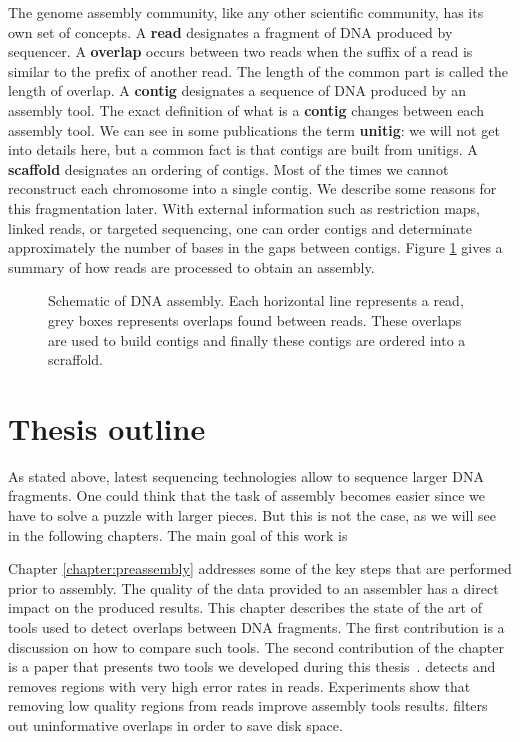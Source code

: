 \documentclass[./main.tex]{subfiles}
\begin{document}
\bigskip

The genome assembly community, like any other scientific community, has its own set of concepts. 
%
A \textbf{read} designates a fragment of DNA produced by sequencer.
%
A \textbf{overlap} occurs between two reads when the suffix of a read is similar to the prefix of another read. The length of the common part is called the length of overlap.
%
A \textbf{contig} designates a sequence of DNA produced by an assembly tool. The exact definition of what is a \textbf{contig} changes between each assembly tool. We can see in some publications the term \textbf{unitig}: we will not get into details here, but a common fact is that contigs are built from unitigs.
%
A \textbf{scaffold} designates an ordering of contigs. Most of the times we cannot reconstruct each chromosome into a single contig. We describe some reasons for this fragmentation later. With external information such as restriction maps, linked reads, or targeted sequencing, one can order contigs and determinate approximately the number of bases in the gaps between contigs. %
%
Figure \ref{intro:fig:assembly} gives a summary of how reads are processed to obtain an assembly.
\begin{figure}[ht]
	\centering
	
	\caption{Schematic of DNA assembly. Each horizontal line represents a read, grey boxes represents overlaps found between reads. These overlaps are used to build contigs and finally these contigs are ordered into a scraffold.}
    \label{intro:fig:assembly}
\end{figure}

\section{Thesis outline}


As stated above, latest sequencing technologies allow to sequence larger DNA fragments. One could think that the task of assembly becomes easier since we have to solve a puzzle with larger pieces. But this is not the case, as we will see in the following chapters. The main goal of this work is 


Chapter \ref{chapter:preassembly} addresses some of the key steps that are performed prior to assembly. %
The quality of the data provided to an assembler has a direct impact on the produced results. %
This chapter describes the state of the art of tools used to detect overlaps between DNA fragments. The first contribution is a discussion on how to compare such tools. 
The second contribution of the chapter is a paper that presents two tools we developed during this thesis~\cite{yacrd}.
\yacrd  detects and removes regions with very high error rates in reads.
Experiments show that removing  low quality regions from reads improve assembly tools results. %
\fpa filters out uninformative overlaps in order to save disk space.
\end{document}
